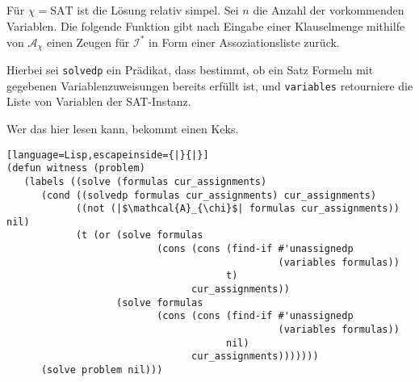 \documentclass{article}
\begin{document}

\subsection{} 
\subsection{} 

Für $\chi = \text{SAT}$ ist die Lösung relativ simpel. Sei $n$ die Anzahl der
vorkommenden Variablen. Die folgende Funktion gibt nach Eingabe einer
Klauselmenge mithilfe von $\mathcal{A}_\chi$ einen Zeugen für $\mathcal{I}^*$ in
Form einer Assoziationsliste zurück.

Hierbei sei \texttt{solvedp} ein Prädikat, dass bestimmt, ob ein Satz Formeln
mit gegebenen Variablenzuweisungen bereits erfüllt ist, und \texttt{variables}
retourniere die Liste von Variablen der SAT-Instanz.

Wer das hier lesen kann, bekommt einen Keks.

\begin{lstlisting}[language=Lisp,escapeinside={|}{|}]
(defun witness (problem)
   (labels ((solve (formulas cur_assignments)
      (cond ((solvedp formulas cur_assignments) cur_assignments)
            ((not (|$\mathcal{A}_{\chi}$| formulas cur_assignments)) nil)
            (t (or (solve formulas 
                          (cons (cons (find-if #'unassignedp 
                                               (variables formulas))
                                      t) 
                                cur_assignments))
                   (solve formulas 
                          (cons (cons (find-if #'unassignedp 
                                               (variables formulas)) 
                                      nil) 
                                cur_assignments)))))))
      (solve problem nil)))
\end{lstlisting}


\end{document}
